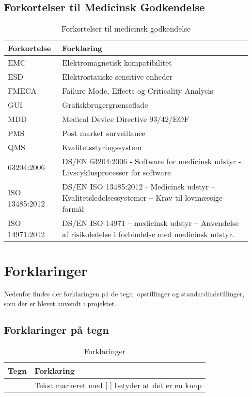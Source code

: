 \section{Forkortelser til Medicinsk Godkendelse}
\begin{table}[htb]
\begin{tabular}{ | m{6em} | m{30em} | } \hline

\textbf{Forkortelse} & \textbf{Forklaring} \\ \hline
EMC & Elektromagnetisk kompatibilitet \\ \hline
ESD & Elektrostatiske sensitive enheder  \\ \hline
FMECA & Failure Mode, Effects og Criticality Analysis \\ \hline
GUI & Grafiskbrugergrænseflade \\ \hline 
MDD & Medical Device Directive 93/42/EØF \\ \hline 
PMS & Post market surveillance \\ \hline 
QMS & Kvalitetsstyringssystem \\ \hline 
63204:2006 & DS/EN 63204:2006 - Software for medicinsk udstyr - Livscyklusprocesser for software \\ \hline 
ISO 13485:2012 & DS/EN ISO 13485:2012 - Medicinsk udstyr – Kvalitetsledelsessystemer – Krav til lovmæssige formål \\ \hline 
ISO 14971:2012 & DS/EN ISO 14971 – medicinsk udstyr – Anvendelse af risikoledelse i forbindelse med medicinsk udstyr. \\ \hline
\end{tabular}
\caption{Forkortelser til medicinsk godkendelse}
\end{table}

\chapter{Forklaringer} 
Nedenfor findes der forklaringen på de tegn, opstillinger og standardindstillinger, som der er blevet anvendt i projektet.

\section{Forklaringer på tegn}
\begin{table}[htb]
\begin{tabular}{ | m{6em} | m{30em} | } \hline

\textbf{Tegn} & \textbf{Forklaring} \\ \hline
[  ] & Tekst markeret med [  ] betyder at det er en knap \\ \hline 
\end{tabular}
\caption{Forklaringer}
\end{table}

